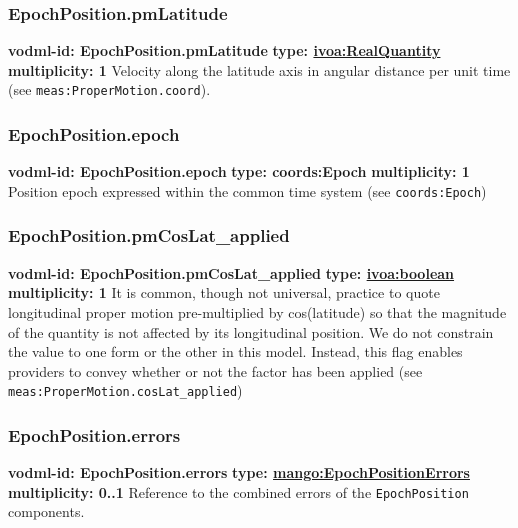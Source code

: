     \subsubsection{EpochPosition.pmLatitude}
    \textbf{vodml-id: EpochPosition.pmLatitude} \newline
    \textbf{type: \hyperref[sect:ivoa]{ivoa:RealQuantity}} \newline
    \textbf{multiplicity: 1} \newline
    Velocity along the latitude axis in angular distance per unit time (see \texttt{meas:ProperMotion.coord}).

    \subsubsection{EpochPosition.epoch}
    \textbf{vodml-id: EpochPosition.epoch} \newline
    \textbf{type: coords:Epoch} \newline
    \textbf{multiplicity: 1} \newline
    Position epoch expressed within the common time system (see \texttt{coords:Epoch})

    \subsubsection{EpochPosition.pmCosLat\_applied}
    \textbf{vodml-id: EpochPosition.pmCosLat\_applied} \newline
    \textbf{type: \hyperref[sect:ivoa]{ivoa:boolean}} \newline
    \textbf{multiplicity: 1} \newline
    It is common, though not universal, practice to quote longitudinal proper motion pre-multiplied by cos(latitude) so that the magnitude of the quantity is not affected by its longitudinal position. We do not constrain the value to one form or the other in this model. Instead, this flag enables providers to convey whether or not the factor has been applied (see \texttt{meas:ProperMotion.cosLat\_applied})

    \subsubsection{EpochPosition.errors}
    \textbf{vodml-id: EpochPosition.errors} \newline
    \textbf{type: \hyperref[sect:EpochPositionErrors]{mango:EpochPositionErrors}} \newline
    \textbf{multiplicity: 0..1} \newline
    Reference to the combined errors of the \texttt{EpochPosition} components.

